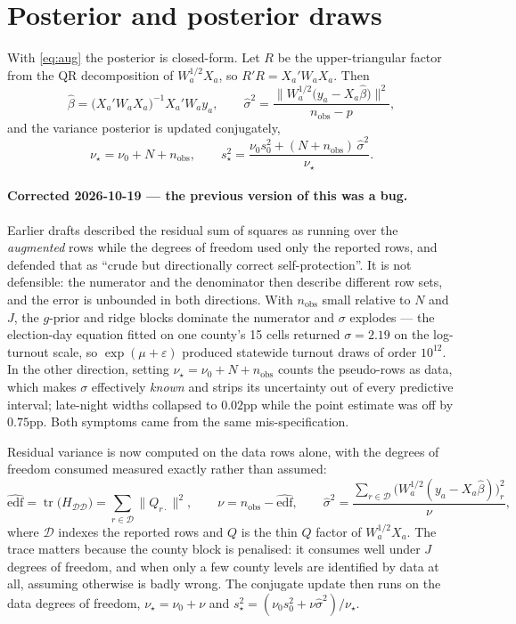 \documentclass[11pt]{article}
\begin{document}
\section{Posterior and posterior draws}\label{sec:post}

With \eqref{eq:aug} the posterior is closed-form. Let $R$ be the upper-triangular factor
from the QR decomposition of $W_a^{1/2} X_a$, so $R'R = X_a' W_a X_a$. Then
\begin{equation}
  \hat\beta = \big(X_a' W_a X_a\big)^{-1} X_a' W_a y_a,
  \qquad
  \hat\sigma^2 = \frac{\big\| W_a^{1/2}\big(y_a - X_a\hat\beta\big)\big\|^2}{n_{\textrm{obs}} - p},
\end{equation}
and the variance posterior is updated conjugately,
\begin{equation}
  \nu_\star = \nu_0 + N + n_{\textrm{obs}},
  \qquad
  s_\star^2 = \frac{\nu_0 s_0^2 + (N + n_{\textrm{obs}})\,\hat\sigma^2}{\nu_\star}.
\end{equation}
\paragraph{Corrected 2026-10-19 --- the previous version of this was a bug.}
Earlier drafts described the residual sum of squares as running over the \emph{augmented}
rows while the degrees of freedom used only the reported rows, and defended that as
``crude but directionally correct self-protection''. It is not defensible: the numerator
and the denominator then describe different row sets, and the error is unbounded in both
directions. With $n_{\textrm{obs}}$ small relative to $N$ and $J$, the $g$-prior and ridge
blocks dominate the numerator and $\sigma$ explodes --- the election-day equation fitted on
one county's 15 cells returned $\sigma = 2.19$ on the log-turnout scale, so
$\exp(\mu+\varepsilon)$ produced statewide turnout draws of order $10^{12}$. In the other
direction, setting $\nu_\star = \nu_0 + N + n_{\textrm{obs}}$ counts the pseudo-rows as
data, which makes $\sigma$ effectively \emph{known} and strips its uncertainty out of every
predictive interval; late-night widths collapsed to $0.02$pp while the point estimate was
off by $0.75$pp. Both symptoms came from the same mis-specification.

Residual variance is now computed on the data rows alone, with the degrees of freedom
consumed measured exactly rather than assumed:
\begin{equation}
  \widehat{\mathrm{edf}} = \operatorname{tr}\!\big(H_{\mathcal{D}\mathcal{D}}\big)
    = \sum_{r \in \mathcal{D}} \|Q_{r\cdot}\|^2,
  \qquad
  \nu = n_{\textrm{obs}} - \widehat{\mathrm{edf}},
  \qquad
  \hat\sigma^2 = \frac{\sum_{r\in\mathcal{D}} \big(W_a^{1/2}(y_a - X_a\hat\beta)\big)_r^2}{\nu},
\end{equation}
where $\mathcal{D}$ indexes the reported rows and $Q$ is the thin $Q$ factor of
$W_a^{1/2}X_a$. The trace matters because the county block is penalised: it consumes well
under $J$ degrees of freedom, and when only a few county levels are identified by data at
all, assuming otherwise is badly wrong. The conjugate update then runs on the data degrees
of freedom, $\nu_\star = \nu_0 + \nu$ and
$s_\star^2 = (\nu_0 s_0^2 + \nu\hat\sigma^2)/\nu_\star$.
\end{document}
